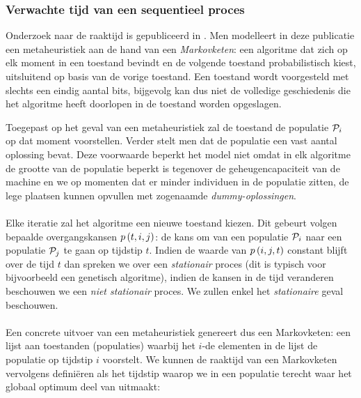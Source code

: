 \subsubsection{Verwachte tijd van een sequentieel proces}
Onderzoek naar de raaktijd is gepubliceerd in \cite{DBLP:journals/jc/ShonkwilerV94}. Men modelleert in deze publicatie een metaheuristiek aan de hand van een \emph{Markovketen}: een algoritme dat zich op elk moment in een toestand bevindt en de volgende toestand probabilistisch kiest, uitsluitend op basis van de vorige toestand. Een toestand wordt voorgesteld met slechts een eindig aantal bits, bijgevolg kan dus niet de volledige geschiedenis die het algoritme heeft doorlopen in de toestand worden opgeslagen.

Toegepast op het geval van een metaheuristiek zal de toestand de populatie $\mathcal{P}_i$ op dat moment voorstellen. Verder stelt men dat de populatie een vast aantal oplossing bevat. Deze voorwaarde beperkt het model niet omdat in elk algoritme de grootte van de populatie beperkt is tegenover de geheugencapaciteit van de machine en we op momenten dat er minder individuen in de populatie zitten, de lege plaatsen kunnen opvullen met zogenaamde \emph{dummy-oplossingen}.
\paragraph{}
Elke iteratie zal het algoritme een nieuwe toestand kiezen. Dit gebeurt volgen bepaalde overgangskansen $p\left(t,i,j\right)$: de kans om van een populatie $\mathcal{P}_i$ naar een populatie $\mathcal{P}_j$ te gaan op tijdstip $t$. Indien de waarde van $p\left(i,j,t\right)$ constant blijft over de tijd $t$ dan spreken we over een \emph{stationair} proces (dit is typisch voor bijvoorbeeld een genetisch algoritme), indien de kansen in de tijd veranderen beschouwen we een \emph{niet stationair} proces. We zullen enkel het \emph{stationaire} geval beschouwen.

\paragraph{}
Een concrete uitvoer van een metaheuristiek genereert dus een Markovketen: een lijst aan toestanden (populaties) waarbij het $i$-de elementen in de lijst de populatie op tijdstip $i$ voorstelt. We kunnen de raaktijd van een Markovketen vervolgens defini\"eren als het tijdstip waarop we in een populatie terecht waar het globaal optimum deel van uitmaakt:

